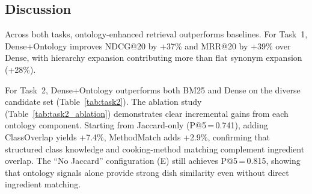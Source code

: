 \subsection{Discussion}

Across both tasks, ontology-enhanced retrieval outperforms baselines. For Task~1, Dense+Ontology improves NDCG@20 by +37\% and MRR@20 by +39\% over Dense, with hierarchy expansion contributing more than flat synonym expansion (+28\%).

For Task~2, Dense+Ontology outperforms both BM25 and Dense on the diverse candidate set (Table~\ref{tab:task2}). The ablation study (Table~\ref{tab:task2_ablation}) demonstrates clear incremental gains from each ontology component. Starting from Jaccard-only (P@5\,=\,0.741), adding ClassOverlap yields +7.4\%, MethodMatch adds +2.9\%, confirming that structured class knowledge and cooking-method matching complement ingredient overlap. The ``No Jaccard'' configuration (E) still achieves P@5\,=\,0.815, showing that ontology signals alone provide strong dish similarity even without direct ingredient matching.
